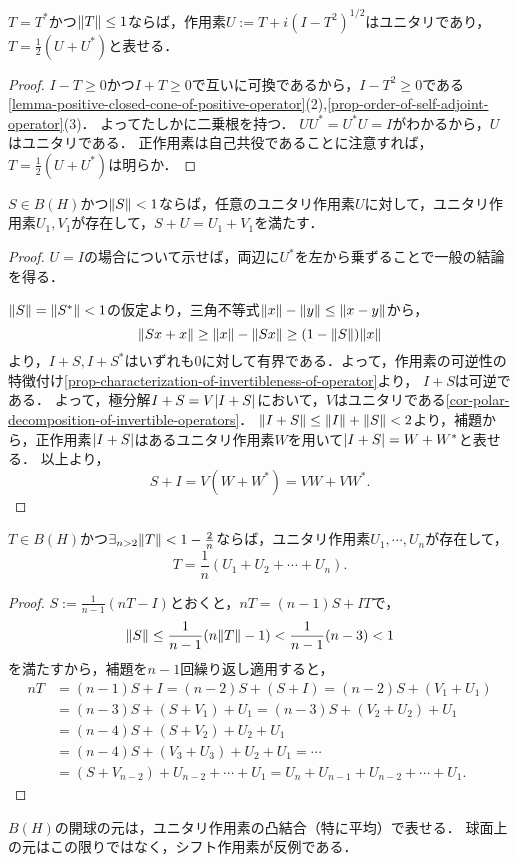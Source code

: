 \documentclass[uplatex,dvipdfmx]{jsreport}
\begin{document}
\begin{lemma}[単位球内の自己共役作用素の表示]
    $T=T^*$かつ$\|T\|\le 1$ならば，作用素$U:=T+i(I-T^2)^{1/2}$はユニタリであり，$T=\frac{1}{2}(U+U^*)$と表せる．
\end{lemma}
\begin{proof}
    $I-T\ge0$かつ$I+T\ge0$で互いに可換であるから，$I-T^2\ge0$である\ref{lemma-positive-closed-cone-of-positive-operator}(2),\ref{prop-order-of-self-adjoint-operator}(3)．
    よってたしかに二乗根を持つ．
    $UU^*=U^*U=I$がわかるから，$U$はユニタリである．
    正作用素は自己共役であることに注意すれば，$T=\frac{1}{2}(U+U^*)$は明らか．
\end{proof}

\begin{lemma}
    $S\in B(H)$かつ$\|S\|<1$ならば，任意のユニタリ作用素$U$に対して，ユニタリ作用素$U_1,V_1$が存在して，$S+U=U_1+V_1$を満たす．
\end{lemma}
\begin{proof}
    $U=I$の場合について示せば，両辺に$U^*$を左から乗ずることで一般の結論を得る．

    $\|S\|=\|S^*\|<1$の仮定より，三角不等式$\|x\|-\|y\|\le\|x-y\|$から，
    \[\|Sx+x\|\ge\|x\|-\|Sx\|\ge(1-\|S\|)\|x\|\]
    より，$I+S,I+S^*$はいずれも$0$に対して有界である．よって，作用素の可逆性の特徴付け\ref{prop-characterization-of-invertibleness-of-operator}より，
    $I+S$は可逆である．
    よって，極分解$I+S=V\lvert I+S\rvert$において，$V$はユニタリである\ref{cor-polar-decomposition-of-invertible-operators}．
    $\|I+S\|\le\|I\|+\|S\|<2$より，補題から，正作用素$\lvert I+S\rvert$はあるユニタリ作用素$W$を用いて$\lvert I+S\rvert=W+W^*$と表せる．
    以上より，
    \[S+I=V(W+W^*)=VW+VW^*.\]
\end{proof}

\begin{proposition}
    $T\in B(H)$かつ$\exists_{n>2}\|T\|<1-\frac{2}{n}$ならば，ユニタリ作用素$U_1,\cdots,U_n$が存在して，
    \[T=\frac{1}{n}(U_1+U_2+\cdots+U_n).\]
\end{proposition}
\begin{proof}
    $S:=\frac{1}{n-1}(nT-I)$とおくと，$nT=(n-1)S+IT$で，
    \[\|S\|\le\frac{1}{n-1}(n\|T\|-1)<\frac{1}{n-1}(n-3)<1\]
    を満たすから，補題を$n-1$回繰り返し適用すると，
    \begin{align*}
        nT&=(n-1)S+I=(n-2)S+(S+I)=(n-2)S+(V_1+U_1)\\
        &=(n-3)S+(S+V_1)+U_1=(n-3)S+(V_2+U_2)+U_1\\
        &=(n-4)S+(S+V_2)+U_2+U_1\\
        &=(n-4)S+(V_3+U_3)+U_2+U_1=\cdots\\
        &=(S+V_{n-2})+U_{n-2}+\cdots+U_1=U_n+U_{n-1}+U_{n-2}+\cdots+U_1.
    \end{align*}
\end{proof}
\begin{remarks}
    $B(H)$の開球の元は，ユニタリ作用素の凸結合（特に平均）で表せる．
    球面上の元はこの限りではなく，シフト作用素が反例である．
\end{remarks}
\end{document}
